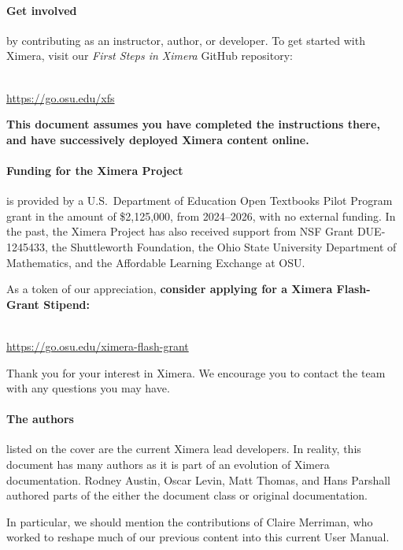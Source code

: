 \documentclass{ximera}
\begin{document}
\paragraph{Get involved} by contributing as an instructor, author,
or developer. To get started with Ximera, visit our
\textit{First Steps in Ximera} GitHub repository:
\begin{center}
    \\
    \small\url{https://go.osu.edu/xfs}
\end{center}
\textbf{This document assumes you have completed the instructions there, and
    have
    successively deployed Ximera content online.}

\paragraph{Funding for the Ximera Project} is provided by
a U.S.\ Department of Education Open Textbooks Pilot Program grant in the
amount of \$2,125,000, from 2024--2026, with no external funding.
In the past, the Ximera Project has
also received support from NSF Grant DUE-1245433, the Shuttleworth
Foundation, the Ohio State University
Department of Mathematics, and the Affordable Learning Exchange at OSU.

As a token of our appreciation, \textbf{consider applying for a Ximera
    Flash-Grant Stipend:}
\begin{center}
    \\
    \small\url{https://go.osu.edu/ximera-flash-grant}
\end{center}
Thank you for your interest in Ximera. We encourage you to contact the
team with any questions you may have.

\paragraph{The authors} listed on the cover are the current Ximera lead
developers. In reality, this document has many authors as it is part of an
evolution of Ximera documentation. Rodney Austin, Oscar Levin, Matt Thomas, and Hans
Parshall authored parts of the either the document class or original
documentation.

In particular, we should mention the contributions of Claire Merriman, who worked to reshape much of our
previous content into this current User Manual.
\end{document}
